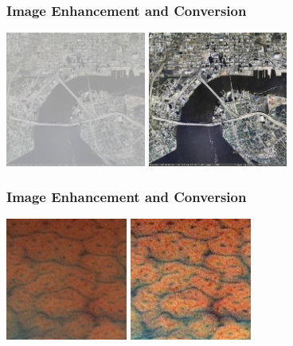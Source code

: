 \documentclass{beamer}
\begin{document}
\begin{frame}
	\frametitle{Image Enhancement and Conversion}
	\includegraphics[width = 4.6cm]{before.jpg}
	\includegraphics[width = 4.6cm]{after.jpg}
\end{frame}

\begin{frame}
	\frametitle{Image Enhancement and Conversion}
	\includegraphics[width = 4cm]{before_1.png}
	\includegraphics[width = 4cm]{after_1.jpg}
\end{frame}
\end{document}
